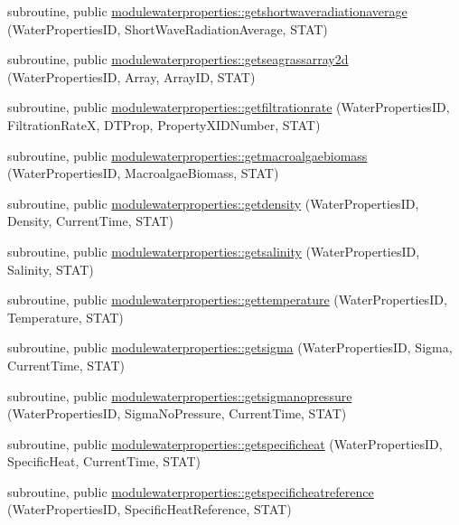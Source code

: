 \begin{DoxyCompactItemize}
\item 
subroutine, public \mbox{\hyperlink{namespacemodulewaterproperties_a821377ba47455562f8f8a055ad136a15}{modulewaterproperties\+::getshortwaveradiationaverage}} (Water\+Properties\+ID, Short\+Wave\+Radiation\+Average, S\+T\+AT)
\item 
subroutine, public \mbox{\hyperlink{namespacemodulewaterproperties_a627fb9974f1a0e254f8b0f6dfa4653ea}{modulewaterproperties\+::getseagrassarray2d}} (Water\+Properties\+ID, Array, Array\+ID, S\+T\+AT)
\item 
subroutine, public \mbox{\hyperlink{namespacemodulewaterproperties_a66ca6cd5369fd51e843c91e5992b9050}{modulewaterproperties\+::getfiltrationrate}} (Water\+Properties\+ID, Filtration\+RateX, D\+T\+Prop, Property\+X\+I\+D\+Number, S\+T\+AT)
\item 
subroutine, public \mbox{\hyperlink{namespacemodulewaterproperties_a786f352ede780fcaec30c57d6653f0f1}{modulewaterproperties\+::getmacroalgaebiomass}} (Water\+Properties\+ID, Macroalgae\+Biomass, S\+T\+AT)
\item 
subroutine, public \mbox{\hyperlink{namespacemodulewaterproperties_a5d3bf3d9b122b9eee78afc56a4047507}{modulewaterproperties\+::getdensity}} (Water\+Properties\+ID, Density, Current\+Time, S\+T\+AT)
\item 
subroutine, public \mbox{\hyperlink{namespacemodulewaterproperties_a3bb9d317e5be992645961cb331bdb55a}{modulewaterproperties\+::getsalinity}} (Water\+Properties\+ID, Salinity, S\+T\+AT)
\item 
subroutine, public \mbox{\hyperlink{namespacemodulewaterproperties_a98876d77f6e973aec7cd3341346e8d8b}{modulewaterproperties\+::gettemperature}} (Water\+Properties\+ID, Temperature, S\+T\+AT)
\item 
subroutine, public \mbox{\hyperlink{namespacemodulewaterproperties_ae8ca73c7b0b0c01064b13ed994d0935c}{modulewaterproperties\+::getsigma}} (Water\+Properties\+ID, Sigma, Current\+Time, S\+T\+AT)
\item 
subroutine, public \mbox{\hyperlink{namespacemodulewaterproperties_a900d2a5073201659f4476e350c5d728a}{modulewaterproperties\+::getsigmanopressure}} (Water\+Properties\+ID, Sigma\+No\+Pressure, Current\+Time, S\+T\+AT)
\item 
subroutine, public \mbox{\hyperlink{namespacemodulewaterproperties_aa36e244423ac757e350a49437c3fb368}{modulewaterproperties\+::getspecificheat}} (Water\+Properties\+ID, Specific\+Heat, Current\+Time, S\+T\+AT)
\item 
subroutine, public \mbox{\hyperlink{namespacemodulewaterproperties_af502ab70c7f5479a4e039154e3b7b099}{modulewaterproperties\+::getspecificheatreference}} (Water\+Properties\+ID, Specific\+Heat\+Reference, S\+T\+AT)

\end{DoxyCompactItemize}
